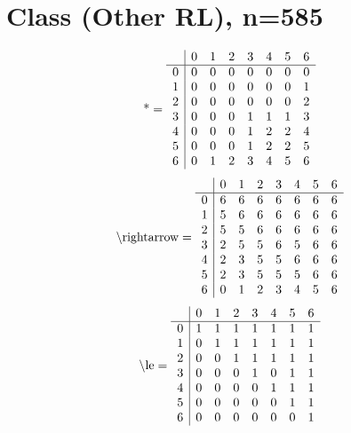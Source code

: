 \documentclass[11pt]{article}
\begin{document}
\section{Class (Other RL), n=585}
\[\text{*} = 
\begin{array}{r | r r r r r r r}
 & 0 & 1 & 2 & 3 & 4 & 5 & 6 \\ \hline
0 & 0 & 0 & 0 & 0 & 0 & 0 & 0 \\
1 & 0 & 0 & 0 & 0 & 0 & 0 & 1 \\
2 & 0 & 0 & 0 & 0 & 0 & 0 & 2 \\
3 & 0 & 0 & 0 & 1 & 1 & 1 & 3 \\
4 & 0 & 0 & 0 & 1 & 2 & 2 & 4 \\
5 & 0 & 0 & 0 & 1 & 2 & 2 & 5 \\
6 & 0 & 1 & 2 & 3 & 4 & 5 & 6 \\
\end{array}
\]
\[\text{\textbackslash rightarrow} = 
\begin{array}{r | r r r r r r r}
 & 0 & 1 & 2 & 3 & 4 & 5 & 6 \\ \hline
0 & 6 & 6 & 6 & 6 & 6 & 6 & 6 \\
1 & 5 & 6 & 6 & 6 & 6 & 6 & 6 \\
2 & 5 & 5 & 6 & 6 & 6 & 6 & 6 \\
3 & 2 & 5 & 5 & 6 & 5 & 6 & 6 \\
4 & 2 & 3 & 5 & 5 & 6 & 6 & 6 \\
5 & 2 & 3 & 5 & 5 & 5 & 6 & 6 \\
6 & 0 & 1 & 2 & 3 & 4 & 5 & 6 \\
\end{array}
\]
\[\text{\textbackslash le} = 
\begin{array}{r | r r r r r r r}
 & 0 & 1 & 2 & 3 & 4 & 5 & 6 \\ \hline
0 & 1 & 1 & 1 & 1 & 1 & 1 & 1 \\
1 & 0 & 1 & 1 & 1 & 1 & 1 & 1 \\
2 & 0 & 0 & 1 & 1 & 1 & 1 & 1 \\
3 & 0 & 0 & 0 & 1 & 0 & 1 & 1 \\
4 & 0 & 0 & 0 & 0 & 1 & 1 & 1 \\
5 & 0 & 0 & 0 & 0 & 0 & 1 & 1 \\
6 & 0 & 0 & 0 & 0 & 0 & 0 & 1 \\
\end{array}
\]
\end{document}

